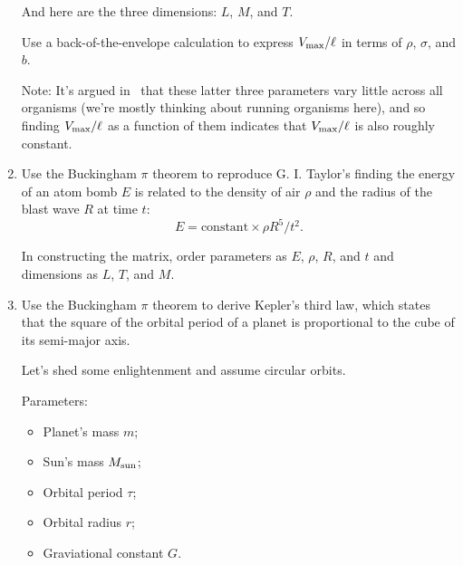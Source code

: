 \begin{enumerate}
  And here are the three dimensions: $L$, $M$, and $T$.

  Use a back-of-the-envelope calculation to
  express $V_{\textnormal{max}} / \ell$ in terms
  of $\rho$, $\sigma$, and $b$.

  Note: It's argued in~\cite{meyer-vernet2015a}
  that these latter three parameters vary
  little across all organisms (we're mostly
  thinking about running organisms here),
  and so finding $V_{\textnormal{max}} / \ell$
  as a function of them indicates
  that $V_{\textnormal{max}} / \ell$ is also roughly constant.

  
   \solutionstart


   \solutionend

\item
  Use the Buckingham $\pi$ theorem to reproduce G. I. Taylor's
  finding the energy of an atom bomb $E$ is related to
  the density of air $\rho$ and the radius of the blast wave $R$
  at time $t$:
  \begin{equation}
  E
  = 
  \mbox{constant} \times
  \rho R^5 / t^2.
  \end{equation}

  In constructing the matrix, order parameters as $E$, $\rho$, $R$, and $t$
  and dimensions as $L$, $T$, and $M$.

  
   \solutionstart


   \solutionend

\item
  Use the Buckingham $\pi$ theorem to derive Kepler's third law,
  which states that the square of the orbital period of a planet
  is proportional to the cube of its semi-major axis.

  Let's shed some enlightenment and assume circular orbits.

  Parameters:
  \begin{itemize}
  \item
    Planet's mass $m$;
  \item
    Sun's mass $M_{\textnormal{sun}}$;
  \item
    Orbital period $\tau$;
  \item
    Orbital radius $r$;
  \item
    Graviational constant $G$.
  \end{itemize}


\end{enumerate}
